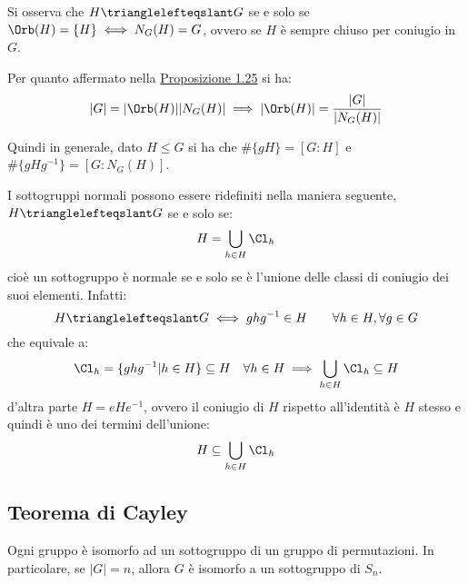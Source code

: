 \documentclass[11pt]{scrartcl}
\begin{document}
\begin{remark}
    Si osserva che $H \trianglelefteqslant G$ se e solo se $\Orb(H) = \{H\} \iff N_G(H) = G$, ovvero se $H$ è sempre chiuso per coniugio in $G$.
\end{remark}

Per quanto affermato nella \hyperref[p:1.25]{Proposizione 1.25} si ha:
    \[ |G| = |\Orb(H)||N_G(H)| \implies |\Orb(H)| = \frac{|G|}{|N_G(H)|}
    \]
\begin{remark}
    Quindi in generale, dato $H \leqslant G$ si ha che $\#\{gH\} = [G:H]$ e $\#\{gHg^{-1}\} = [G : N_G(H)]$.
\end{remark}

\begin{remark}
    I sottogruppi normali possono essere ridefiniti nella maniera seguente, $H \trianglelefteqslant G$ se e solo se:
        \[ H = \bigcup_{h \in H} \Cl_h
            \]
    cioè un sottogruppo è normale se e solo se è l'unione delle classi di coniugio dei suoi elementi. Infatti:
        \[ H \trianglelefteqslant G \iff ghg^{-1} \in H \qquad \forall h \in H, \forall g \in G
            \]
    che equivale a:
        \[ \Cl_h = \{ghg^{-1} | h \in H\} \subseteq H  \quad \forall h \in H \implies \bigcup_{h \in H} \Cl_h \subseteq H
            \]
    d'altra parte $H = eHe^{-1}$, ovvero il coniugio di $H$ rispetto all'identità è $H$ stesso e quindi è uno dei termini dell'unione:
        \[ H \subseteq \bigcup_{h \in H} \Cl_h
            \] 
    
\end{remark}

\newpage
\subsection{Teorema di Cayley}

\begin{theorem}
    \label{p:Cayley}
    Ogni gruppo è isomorfo ad un sottogruppo di un gruppo di permutazioni. In particolare, se $|G| = n$, allora 
    $G$ è isomorfo a un sottogruppo di $S_n$.
\end{theorem}
\end{document}
